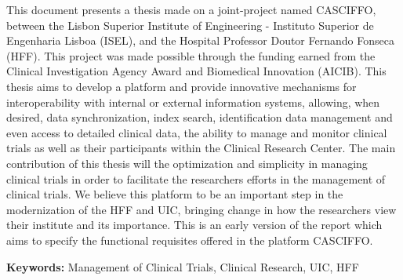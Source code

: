 
This document presents a thesis made on a joint-project named CASCIFFO, between the Lisbon Superior Institute of Engineering - Instituto Superior de Engenharia Lisboa (ISEL), and the Hospital Professor Doutor Fernando Fonseca (HFF). This project was made possible through the funding earned from the Clinical Investigation Agency Award and Biomedical Innovation (AICIB). 
This thesis aims to develop a platform and provide innovative mechanisms for interoperability with internal or external information systems, allowing, when desired, data synchronization, index search, identification data management and even access to detailed clinical data, the ability to manage and monitor clinical trials as well as their participants within the Clinical Research Center. 
The main contribution of this thesis will the optimization and simplicity in managing clinical trials in order to facilitate the researchers efforts in the management of clinical trials.
We believe this platform to be an important step in the modernization of the HFF and UIC, bringing change in how the researchers view their institute and its importance. 
This is an early version of the report which aims to specify the functional requisites offered in the platform CASCIFFO. 

\textbf{Keywords:} Management of Clinical Trials, Clinical Research, UIC, HFF
